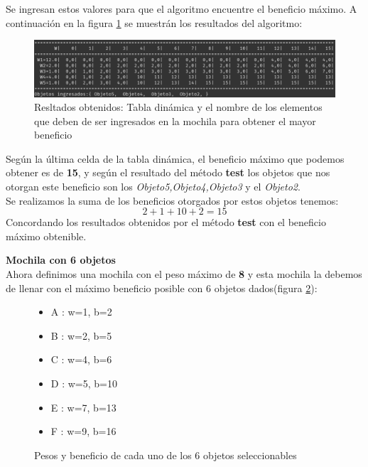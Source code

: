             Se ingresan estos valores para que el algoritmo encuentre el beneficio máximo. A continuación en la figura \ref{ResultadosMochilaObjetos5} se muestrán los resultados del algoritmo:
            \begin{figure}[h!]
                \centering
                \includegraphics[width=\textwidth]{Knapsack/MochilaObjetos5.png}
                \caption{Resltados obtenidos: Tabla dinámica y el nombre de los elementos que deben de ser ingresados en la mochila para obtener el mayor beneficio}
                \label{ResultadosMochilaObjetos5}
            \end{figure}
            
            Según la última celda de la tabla dinámica, el beneficio máximo que podemos obtener es de \textbf{15}, y según el resultado del método \textbf{test} los objetos que nos otorgan este beneficio son los \textit{Objeto5,Objeto4,Objeto3} y el \textit{Objeto2}.\\
            
            Se realizamos la suma de los beneficios otorgados por estos objetos tenemos:
            $$ 2+1+10+2 = 15$$
            Concordando los resultados obtenidos por el método \textbf{test} con el beneficio máximo obtenible.
        
        \hfill \break
        \hfill \break
        
        \textbf{Mochila con 6 objetos}\\
        
            Ahora definimos una mochila con el peso máximo de \textbf{8} y esta mochila la debemos de llenar con el máximo beneficio posible con 6 objetos dados(figura \ref{MochilaObjetos6}):
            
            \begin{figure}[h!]
                \centering
                    \begin{itemize}
                        \item A : w=1, b=2
                        \item B : w=2, b=5
                        \item C : w=4, b=6
                        \item D : w=5, b=10
                        \item E : w=7, b=13 
                        \item F : w=9, b=16 
                    \end{itemize}
                \caption{Pesos y beneficio de cada uno de los 6 objetos seleccionables}
                \label{MochilaObjetos6}
            \end{figure}
            
